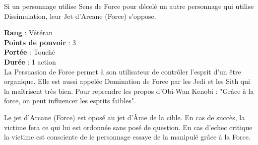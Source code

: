 \begin{description}[align=left]
		Si un personnage utilise Sens de Force pour décelé un autre personnage qui utilise Dissimulation, leur Jet d'Arcane (Force) s'oppose.

	\item [Persuasion de Force]
	    \textbf{Rang} : Vétéran\\
		\textbf{Points de pouvoir} : 3\\
		\textbf{Portée} : Touché\\
		\textbf{Durée} : 1 action\\
		La Persuasion de Force permet à son utilisateur de contrôler  l'esprit d'un être organique. Elle est aussi appelée Domination de Force par les Jedi et les Sith qui la maîtrisent très bien. Pour reprendre les propos d'Obi-Wan Kenobi : "Grâce à la force, on peut influencer les esprits faibles". 

		Le jet d'Arcane (Force) est oposé au jet d'\^Ame de la cible. En cas de succès, la victime fera ce qui lui est ordonnée sans posé de question. En cas d'echec critique la victime est consciente de le personnage essaye de la manipulé grâce à la Force.

\end{description}

